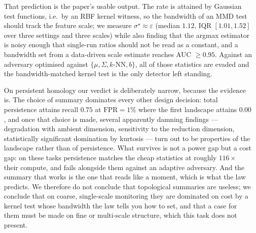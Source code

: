 \documentclass[11pt]{article}
\theoremstyle{remark}
\begin{document}
That prediction is the paper's usable output. The rate is attained by Gaussian test functions, i.e.\
by an RBF kernel witness, so the bandwidth of an MMD test should track the feature scale; we measure
$\sigma^\star\approx\varepsilon$ (median $1.12$, IQR $[1.01,1.52]$ over three settings and three
scales) while also finding that the argmax estimator is noisy enough that single-run ratios should
not be read as a constant, and a bandwidth set from a data-driven scale estimate reaches
AUC $\ge0.95$. Against an adversary optimised against $\{\mu,\Sigma,k\text{-NN},b\}$, all of
those statistics are evaded and the bandwidth-matched kernel test is the only detector left standing.

On persistent homology our verdict is deliberately narrow, because the evidence is. The choice of
summary dominates every other design decision: total persistence attains recall $0.75$ at
$\mathrm{FPR}=1\%$ where the first landscape attains $0.00$, and once that choice is made, several
apparently damning findings --- degradation with ambient dimension, sensitivity to the reduction
dimension, statistically significant domination by kurtosis --- turn out to be properties of the
landscape rather than of persistence. What survives is not a power gap but a cost gap: on these
tasks persistence matches the cheap statistics at roughly $116\times$ their compute, and fails
alongside them against an adaptive adversary. And the summary that works is the one that reads like
a moment, which is what the law predicts. We therefore do not conclude that topological summaries
are useless; we conclude that on coarse, single-scale monitoring they are dominated on cost by a
kernel test whose bandwidth the law tells you how to set, and that a case for them must be made on
fine or multi-scale structure, which this task does not present.



\end{document}

